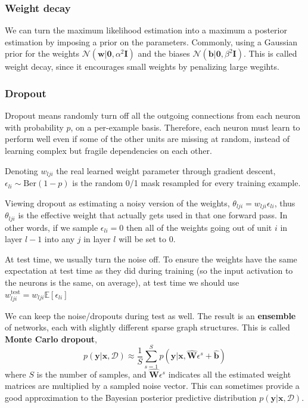 \documentclass[11pt]{article}
\begin{document}
\subsubsection*{Weight decay}
We can turn the maximum likelihood estimation into a maximum a posterior estimation by imposing a prior on the parameters.
Commonly, using a Gaussian prior for the weights $\mathcal{N}(\boldsymbol{w}|\boldsymbol{0}, \alpha^2 \mathbf{I})$ and the biases $\mathcal{N}(\boldsymbol{b}|\boldsymbol{0}, \beta^2 \mathbf{I})$.
This is called weight decay, since it encourages small weights by penalizing large wegihts.

\subsubsection*{Dropout}
Dropout means randomly turn off all the outgoing connections from each neuron with probability $p$, on a per-example basis.
Therefore, each neuron must learn to perform well even if some of the other units are missing at random, instead of learning complex but fragile dependencies on each other.

Denoting $w_{lji}$ the real learned weight parameter through gradient descent, $\epsilon_{li} \sim \text{Ber}(1-p)$ is the random 0/1 mask resampled for every training example.

Viewing dropout as estimating a noisy version of the weights, $\theta_{lji} = w_{lji} \epsilon_{li}$, thus $\theta_{lji}$ is the effective weight that actually gets used in that one forward pass. 
In other words, if we sample $\epsilon_{li} = 0$ then all of the weights going out of unit $i$ in layer $l-1$ into any $j$ in layer $l$ will be set to 0.

At test time, we usually turn the noise off.
To ensure the weights have the same expectation at test time as they did during training (so the input activation to the neurons is the same, on average), at test time we should use $w_{lji}^{\text{test}} = w_{lji} \mathbb{E}[\epsilon_{li}]$

We can keep the noise/dropouts during test as well. The result is an \textbf{ensemble} of networks, each with slightly different sparse graph structures. This is called \textbf{Monte Carlo dropout},
\[
p(\boldsymbol{y} | \boldsymbol{x}, \mathcal{D}) \approx \frac{1}{S} \sum_{s=1}^{S} p(\boldsymbol{y} | \boldsymbol{x}, \hat{\mathbf{W}} \epsilon^s + \hat{\boldsymbol{b}})
\]
where $S$ is the number of samples, and $\hat{\mathbf{W}} \epsilon^s$ indicates all the estimated weight matrices are multiplied by a sampled noise vector. 
This can sometimes provide a good approximation to the Bayesian posterior predictive distribution $p(\boldsymbol{y} | \boldsymbol{x}, \mathcal{D})$.
\end{document}
